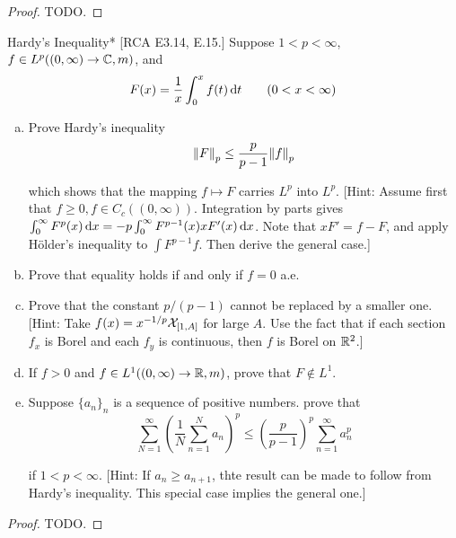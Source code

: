\begin{proof}
    TODO. 
\end{proof}


\begin{problem}{Hardy's Inequality}*
    [RCA E3.14, E.15.] Suppose \(1 < p < \infty\), \(f \in L^p((0, \infty) \to \mathbb{C}, m)\), and 
    \[
        F(x) = \frac{1}{x} \int_0^x f(t) \, \mathrm{d}t
        \qquad
        (0 < x < \infty)
    \]

    \begin{enumerate}[(a)]
        \itemsep0em
        \item Prove Hardy's inequality 
        \[
            \norm{F}_p \leq \frac{p}{p-1} \norm{f}_p
        \]

        which shows that the mapping \(f \mapsto F\) carries \(L^p\) into \(L^p\). [Hint: Assume first that \(f \geq 0, f \in C_c((0,\infty))\). Integration by parts gives \(\int_0^\infty F^p(x) \, \mathrm{d}x = -p \int_0^\infty F^{p-1}(x) x F'(x) \, \mathrm{d}x\). Note that \(xF' = f - F\), and apply H\"older's inequality to \(\int F^{p-1} f\). Then derive the general case.]
        \item Prove that equality holds if and only if \(f = 0\) a.e. 
        \item Prove that the constant \(p/(p-1)\) cannot be replaced by a smaller one. [Hint: Take \(f(x) = x^{-1/p} \mathcal{X}_{[1, A]}\) for large \(A\). Use the fact that if each section \(f_x\) is Borel and each \(f_y\) is continuous, then \(f\) is Borel on \(\mathbb{R}^2\).]
        \item If \(f > 0\) and \(f \in L^1((0, \infty) \to \mathbb{R}, m)\), prove that \(F \not\in L^1\). 
        \item Suppose \(\{a_n\}_n\) is a sequence of positive numbers. prove that 
        \[
            \sum_{N=1}^\infty \left( \frac{1}{N} \sum_{n=1}^N a_n \right)^p
            \leq \left( \frac{p}{p-1} \right)^p \sum_{n=1}^\infty a_n^p
        \]

        if \(1 < p < \infty\). [Hint: If \(a_n \geq a_{n+1}\), thte result can be made to follow from Hardy's inequality. This special case implies the general one.]
    \end{enumerate}
\end{problem}


\begin{proof}
    TODO. 
\end{proof}


